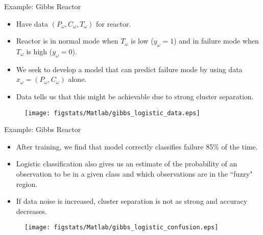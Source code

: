 \documentclass[9pt]{beamer}
\begin{document}
%
\begin{frame}{Example: Gibbs Reactor}

\begin{itemize}
\item Have data $(P_\omega,C_\omega,T_\omega)$ for reactor.
\item Reactor is in normal mode when $T_\omega$ is low ($y_\omega=1$) and in failure mode when $T_\omega$ is high ($y_\omega=0$).
\item We seek to develop a model that can predict failure mode by using data $x_\omega=(P_\omega,C_\omega)$ alone. 
\item Data tells us that this might be achievable due to strong cluster separation.
\end{itemize}

\begin{figure}[!htb]
    \centering
	\texttt{[image: figstats/Matlab/gibbs\_logistic\_data.eps]}
\end{figure}

\end{frame}

%
\begin{frame}{Example: Gibbs Reactor}

\begin{itemize}
\item After training, we find that model correctly classifies  failure 85\% of the time. 
\item Logistic classification also gives us an estimate of the probability of an observation to be in a given class and which observations are in the ``fuzzy" region. 
\item If data noise is increased, cluster separation is not as strong and accuracy decreases. 
\end{itemize}

\begin{figure}[!htb]
    \centering
	\texttt{[image: figstats/Matlab/gibbs\_logistic\_confusion.eps]}
\end{figure}



\end{frame}

\end{document}
